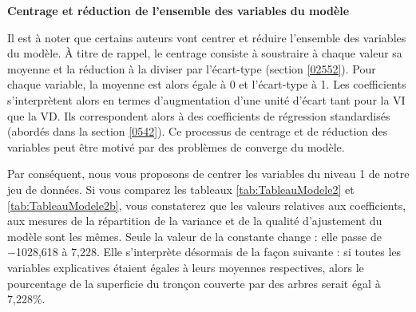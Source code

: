 \documentclass[
  11pt,
  french,
]{book}
\makeatletter
\newenvironment{kframev}{%
\medskip{}
\setlength{\fboxsep}{.8em}
 \def\at@end@of@kframev{}%
 \ifinner\ifhmode%
  \def\at@end@of@kframev{\end{minipage}}%
  \begin{minipage}{\columnwidth}%
 \fi\fi%
 \def\FrameCommand##1{\hskip\@totalleftmargin \hskip-\fboxsep
 \colorbox{shadebluecolor}{##1}\hskip-\fboxsep
     \hskip-\linewidth \hskip-\@totalleftmargin \hskip\columnwidth}%
 \MakeFramed {\advance\hsize-\width
   \@totalleftmargin\z@ \linewidth\hsize
   \@setminipage}}%
 {\par\unskip\endMakeFramed%
 \at@end@of@kframev}
\newenvironment{rmdblock}[1]
  {
  \begin{itemize}
  \renewcommand{\labelitemi}{
    \raisebox{-.7\height}[0pt][0pt]{
      {\setkeys{Gin}{width=3em,keepaspectratio}\texttt{[image: images/\#1]}}
    }
  }
  \setlength{\fboxsep}{1em}
  \begin{kframev}
  \small
  \item
  }
  {
  \end{kframev}
  \end{itemize}
  }
\newenvironment{bloc_astuce}
  {\begin{rmdblock}{astuce}}
  {\end{rmdblock}}
\makeatother
\begin{document}
\begin{bloc_astuce}
\textbf{Centrage et réduction de l'ensemble des variables du modèle}

Il est à noter que certains auteurs vont centrer et réduire l'ensemble des variables du modèle. À titre de rappel, le centrage consiste à soustraire à chaque valeur sa moyenne et la réduction à la diviser par l'écart-type (section \ref{02552}). Pour chaque variable, la moyenne est alors égale à 0 et l'écart-type à 1. Les coefficients s'interprètent alors en termes d'augmentation d'une unité d'écart tant pour la VI que la VD. Ils correspondent alors à des coefficients de régression standardisés (abordés dans la section \ref{0542}).
Ce processus de centrage et de réduction des variables peut être motivé par des problèmes de converge du modèle.

\end{bloc_astuce}

Par conséquent, nous vous proposons de centrer les variables du niveau 1 de notre jeu de données. Si vous comparez les tableaux \ref{tab:TableauModele2} et \ref{tab:TableauModele2b}, vous constaterez que les valeurs relatives aux coefficients, aux mesures de la répartition de la variance et de la qualité d'ajustement du modèle sont les mêmes. Seule la valeur de la constante change : elle passe de −1028,618 à 7,228. Elle s'interprète désormais de la façon suivante : si toutes les variables explicatives étaient égales à leurs moyennes respectives, alors le pourcentage de la superficie du tronçon couverte par des arbres serait égal à 7,228\%.
\end{document}
